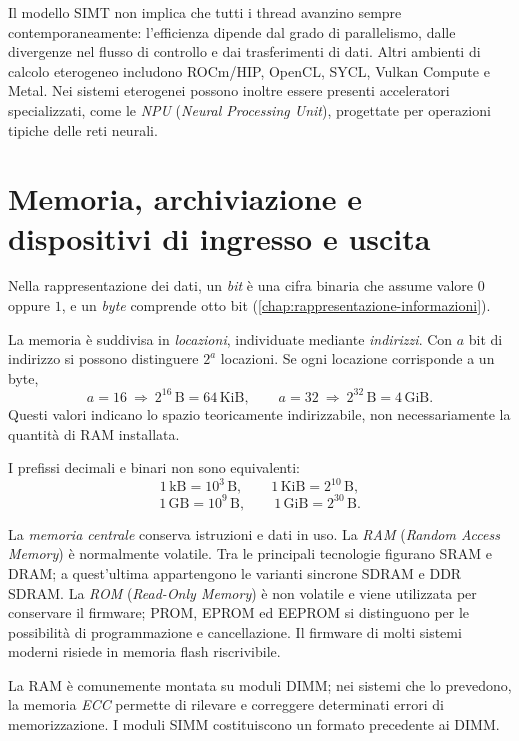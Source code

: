 Il modello SIMT non implica che tutti i thread avanzino sempre
contemporaneamente: l'efficienza dipende dal grado di parallelismo,
dalle divergenze nel flusso di controllo e dai trasferimenti di dati.
Altri ambienti di calcolo eterogeneo includono ROCm/HIP, OpenCL,
SYCL, Vulkan Compute e Metal. Nei sistemi eterogenei possono inoltre
essere presenti acceleratori specializzati, come le \emph{NPU}
(\emph{Neural Processing Unit}), progettate per operazioni tipiche
delle reti neurali.

\section{Memoria, archiviazione e dispositivi di ingresso e uscita}
\label{sec:fi-memoria-archiviazione}

Nella rappresentazione dei dati, un \emph{bit} è una cifra binaria
che assume valore \(0\) oppure \(1\), e un \emph{byte} comprende otto
bit (\cref{chap:rappresentazione-informazioni}).

La memoria è suddivisa in \emph{locazioni}, individuate mediante
\emph{indirizzi}. Con \(a\) bit di indirizzo si possono distinguere
\(2^a\) locazioni. Se ogni locazione corrisponde a un byte,
\[
  a=16\ \Longrightarrow\ 2^{16}\,\mathrm{B}=64\,\mathrm{KiB},
  \qquad
  a=32\ \Longrightarrow\ 2^{32}\,\mathrm{B}=4\,\mathrm{GiB}.
\]
Questi valori indicano lo spazio teoricamente indirizzabile,
non necessariamente la quantità di RAM installata.

I prefissi decimali e binari non sono equivalenti:
\[
  1\,\mathrm{kB}=10^3\,\mathrm{B},
  \qquad
  1\,\mathrm{KiB}=2^{10}\,\mathrm{B},
\]
\[
  1\,\mathrm{GB}=10^9\,\mathrm{B},
  \qquad
  1\,\mathrm{GiB}=2^{30}\,\mathrm{B}.
\]

La \emph{memoria centrale} conserva istruzioni e dati in uso.
La \emph{RAM} (\emph{Random Access Memory}) è normalmente volatile.
Tra le principali tecnologie figurano SRAM e DRAM; a quest'ultima
appartengono le varianti sincrone SDRAM e DDR SDRAM.
La \emph{ROM} (\emph{Read-Only Memory}) è non volatile e viene
utilizzata per conservare il firmware; PROM, EPROM ed EEPROM si
distinguono per le possibilità di programmazione e cancellazione. Il
firmware di molti sistemi moderni risiede in memoria flash riscrivibile.

La RAM è comunemente montata su moduli DIMM; nei sistemi che lo
prevedono, la memoria \emph{ECC} permette di rilevare e correggere
determinati errori di memorizzazione. I moduli SIMM costituiscono
un formato precedente ai DIMM.

